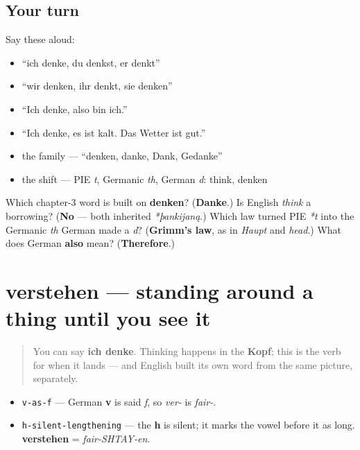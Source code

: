 \subsection*{Your turn}
Say these aloud:

\begin{itemize}
\raggedright
  \item \textquotedblleft{}ich denke, du denkst, er denkt\textquotedblright{}
  \item \textquotedblleft{}wir denken, ihr denkt, sie denken\textquotedblright{}
  \item \textquotedblleft{}Ich denke, also bin ich.\textquotedblright{}
  \item \textquotedblleft{}Ich denke, es ist kalt. Das Wetter ist gut.\textquotedblright{}
  \item the family — \textquotedblleft{}denken, danke, Dank, Gedanke\textquotedblright{}
  \item the shift — PIE \emph{t}, Germanic \emph{th}, German \emph{d}: think, denken
\end{itemize}

\begin{tcolorbox}[breakable,colback=teal!4,colframe=teal!35!black,title={Before you move on}]
Which chapter-3 word is built on \textbf{denken}? (\textbf{Danke}.) Is English \emph{think} a borrowing? (\textbf{No} — both inherited \emph{*þankijaną}.) Which law turned PIE \emph{*t} into the Germanic \emph{th} German made a \emph{d}? (\textbf{Grimm's law}, as in \emph{Haupt} and \emph{head}.) What does German \textbf{also} mean? (\textbf{Therefore}.)
\end{tcolorbox}
\section[verstehen]{verstehen — standing around a thing until you see it}

\label{lesson:GE-C24-verstehen}



\begin{quote}
You can say \textbf{ich denke}. Thinking happens in the \textbf{Kopf}; this is the verb for when it lands — and English built its own word from the same picture, separately.
\end{quote}

\begin{sounds}
\begin{itemize}
\raggedright
  \item \texttt{v-as-f} — German \textbf{v} is said \emph{f}, so \emph{ver-} is \emph{fair-}.
  \item \texttt{h-silent-lengthening} — the \textbf{h} is silent; it marks the vowel before it as long. \textbf{verstehen} = \emph{fair-SHTAY-en}.
\end{itemize}
\end{sounds}

